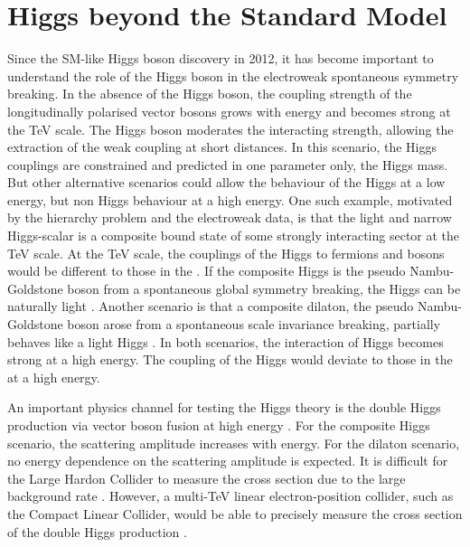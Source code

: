 \section{Higgs beyond the Standard Model}
\label{sec:theoryHiggsBSM}

Since the SM-like Higgs boson discovery in 2012, it has become important to understand the role of the Higgs boson in the electroweak spontaneous symmetry breaking. In the absence of the Higgs boson, the coupling strength of the longitudinally polarised vector bosons grows with energy and becomes strong at the TeV scale. The \SM Higgs boson moderates the interacting strength, allowing the extraction of the weak coupling at short distances. In this scenario, the \SM Higgs couplings are constrained and predicted in one parameter only, the Higgs mass. But other alternative scenarios could allow the behaviour of the \SM Higgs at a low energy, but non \SM Higgs behaviour at a high energy. One such example, motivated by the hierarchy problem and the electroweak data, is that the light and narrow Higgs-scalar is a composite bound state of some strongly interacting sector at the TeV scale.   At the TeV scale, the couplings of the Higgs to fermions and bosons would be different to those in the \SM. If the composite Higgs is the pseudo Nambu-Goldstone boson from a spontaneous global symmetry breaking, the Higgs can be naturally light \cite{Kaplan:1983fs}. Another scenario is that a composite dilaton, the pseudo Nambu-Goldstone boson arose from a spontaneous scale invariance breaking, partially behaves like a light Higgs \cite{Goldberger:2008zz}. In both scenarios, the interaction of Higgs becomes strong at a high energy. The coupling of the Higgs would deviate to those in the \SM at a high energy.

An important physics channel for testing the Higgs theory is the double Higgs production via vector boson fusion at high energy \cite{Giudice:2007fh,Contino:2010mh,Contino:2013gna}. For the composite Higgs scenario, the scattering amplitude increases with energy. For the dilaton scenario, no energy dependence on the scattering amplitude is expected. It is difficult for the Large Hardon Collider to measure the cross section due to the large \SM background rate \cite{Contino:2010mh}. However, a multi-TeV linear electron-position collider, such as the Compact Linear Collider, would be able to precisely measure the cross section of the double Higgs production \cite{Barger:2003rs}.


